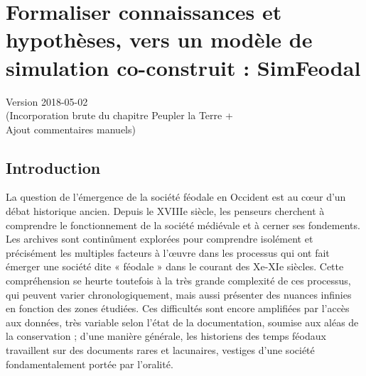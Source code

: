 \documentclass[12pt, a4paper, oneside]{book}
\begin{document}
	\setcounter{part}{0}
	\setcounter{chapter}{1}
	\setcounter{secnumdepth}{4}
	
	\chapter{Formaliser connaissances et hypothèses, vers un modèle de simulation co-construit : SimFeodal}
	\begin{center}
		{\large Version 2018-05-02\\
			(Incorporation brute du chapitre Peupler la Terre +\\ Ajout commentaires manuels)}
	\end{center}
	
	\section{Introduction}
	
	La question de l'émergence de la société féodale en Occident est au cœur d'un débat historique ancien.
	Depuis le XVIIIe siècle, les penseurs cherchent à comprendre le fonctionnement de la société médiévale et à cerner ses fondements.
	Les archives sont continûment explorées pour comprendre isolément et précisément les multiples facteurs à l'œuvre dans les processus qui ont fait émerger une société dite « féodale » dans le courant des Xe-XIe siècles.
	Cette compréhension se heurte toutefois à la très grande complexité de ces processus, qui peuvent varier chronologiquement, mais aussi présenter des nuances infinies en fonction des zones étudiées.
	Ces difficultés sont encore amplifiées par l'accès aux données, très variable selon l'état de la documentation, soumise aux aléas de la conservation ; d'une manière générale, les historiens des temps féodaux travaillent sur des documents rares et lacunaires, vestiges d'une société fondamentalement portée par l'oralité.
	
\end{document}
